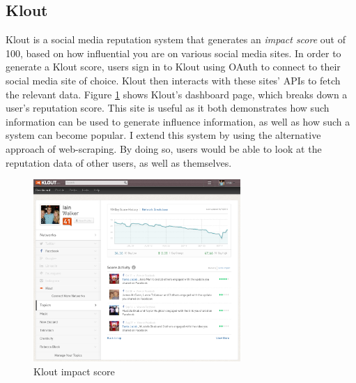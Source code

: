 

\subsection{Klout}

Klout \cite{klout_site} is a social media reputation system that generates an \textit{impact score} out of 100, based on how influential you are on various social media sites. In order to generate a Klout score, users sign in to Klout using OAuth to connect to their social media site of choice. Klout then interacts with these sites' APIs to fetch the relevant data. Figure \ref{fig:KLOUT} shows Klout's dashboard page, which breaks down a user's reputation score. This site is useful as it both demonstrates how such information can be used to generate influence information, as well as how such a system can become popular. I extend this system by using the alternative approach of web-scraping. By doing so, users would be able to look at the reputation data of other users, as well as themselves. 

\begin{figure}[h!]
\centering
\includegraphics[width=0.7\textwidth]{Images/klout.png}
\caption{Klout impact score}
\label{fig:KLOUT}
\end{figure}

